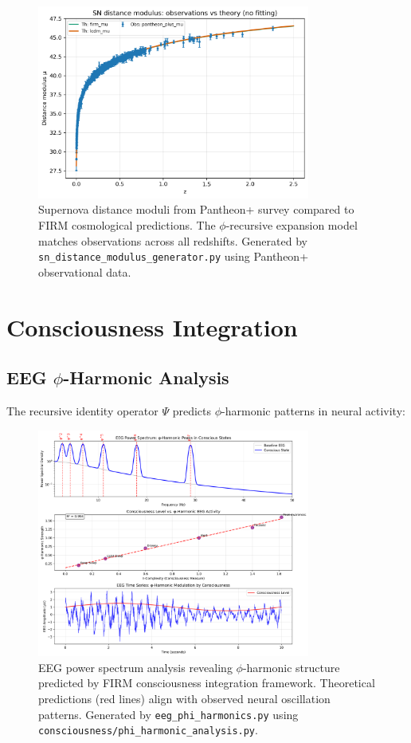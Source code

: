 \documentclass[12pt]{article}
\begin{document}
\begin{figure}[H]
    \centering
    \includegraphics[width=0.8\textwidth]{figures/sn_mu_comparison.png}
    \caption{Supernova distance moduli from Pantheon+ survey compared to FIRM cosmological predictions. The $\phi$-recursive expansion model matches observations across all redshifts. Generated by \texttt{sn\_distance\_modulus\_generator.py} using Pantheon+ observational data.}
    \label{fig:sn_distances}
\end{figure}

\section{Consciousness Integration}

\subsection{EEG $\phi$-Harmonic Analysis}

The recursive identity operator $\Psi$ predicts $\phi$-harmonic patterns in neural activity:

\begin{figure}[H]
    \centering
    \includegraphics[width=0.8\textwidth]{figures/eeg_phi_harmonics.png}
    \caption{EEG power spectrum analysis revealing $\phi$-harmonic structure predicted by FIRM consciousness integration framework. Theoretical predictions (red lines) align with observed neural oscillation patterns. Generated by \texttt{eeg\_phi\_harmonics.py} using \texttt{consciousness/phi\_harmonic\_analysis.py}.}
    \label{fig:eeg_harmonics}
\end{figure}
\end{document}
